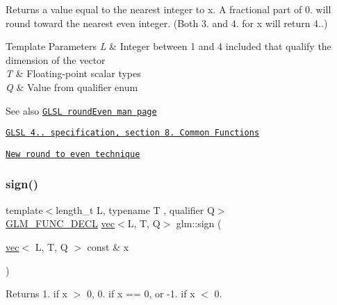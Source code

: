 Returns a value equal to the nearest integer to x. A fractional part of 0. will round toward the nearest even integer. (Both 3. and 4. for x will return 4..)


\begin{DoxyTemplParams}{Template Parameters}
{\em L} & Integer between 1 and 4 included that qualify the dimension of the vector \\
\hline
{\em T} & Floating-\/point scalar types \\
\hline
{\em Q} & Value from qualifier enum\\
\hline
\end{DoxyTemplParams}
\begin{DoxySeeAlso}{See also}
\href{http://www.opengl.org/sdk/docs/manglsl/xhtml/roundEven.xml}{\tt G\+L\+SL round\+Even man page} 

\href{http://www.opengl.org/registry/doc/GLSLangSpec.4.20.8.pdf}{\tt G\+L\+SL 4.. specification, section 8. Common Functions} 

\href{http://developer.amd.com/documentation/articles/pages/New-Round-to-Even-Technique.aspx}{\tt New round to even technique} 
\end{DoxySeeAlso}
\mbox{\label{group__core__func__common_ga1e2e5cfff800056540e32f6c9b604b28}} 
\subsubsection{\texorpdfstring{sign()}{sign()}}
{\footnotesize\ttfamily template$<$length\+\_\+t L, typename T , qualifier Q$>$ \\
\hyperlink{setup_8hpp_ab2d052de21a70539923e9bcbf6e83a51}{G\+L\+M\+\_\+\+F\+U\+N\+C\+\_\+\+D\+E\+CL} \hyperlink{structglm_1_1vec}{vec}$<$L, T, Q$>$ glm\+::sign (\begin{DoxyParamCaption}\item[{\hyperlink{structglm_1_1vec}{vec}$<$ L, T, Q $>$ const \&}]{x }\end{DoxyParamCaption})}

Returns 1. if x $>$ 0, 0. if x == 0, or -\/1. if x $<$ 0.


